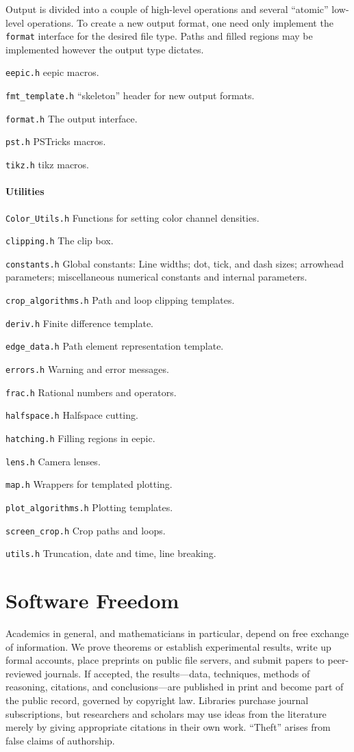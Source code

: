 \documentclass[12pt,letterpaper]{book}
\newcommand{\code}[1]{\texttt{#1}}
\newcommand{\Header}[1]{\smallskip\noindent\texttt{#1}\quad}%
\newcommand{\texinfoappendix}[2]{\chapter{#2}}
\begin{document}
Output is divided into a couple of high-level operations and several
``atomic'' low-level operations.  To create a new output
format, one need only implement the \code{format} interface for the
desired file type. Paths and filled regions may be implemented however
the output type dictates.

\Header{eepic.h} eepic macros.

\Header{fmt\_template.h} ``skeleton'' header for new output formats.

\Header{format.h} The output interface.

\Header{pst.h} PSTricks macros.

\Header{tikz.h} tikz macros.


\subsubsection*{Utilities}

\Header{Color\_Utils.h} Functions for setting color channel densities.

\Header{clipping.h} The clip box.

\Header{constants.h} Global constants: Line widths; dot, tick, and
dash sizes; arrowhead parameters; miscellaneous numerical constants
and internal parameters.

\Header{crop\_algorithms.h} Path and loop clipping templates.

\Header{deriv.h} Finite difference template.

\Header{edge\_data.h} Path element representation template.

\Header{errors.h} Warning and error messages.

\Header{frac.h} Rational numbers and operators.

\Header{halfspace.h} Halfspace cutting.

\Header{hatching.h} Filling regions in eepic.

\Header{lens.h} Camera lenses.

\Header{map.h} Wrappers for templated plotting.

\Header{plot\_algorithms.h} Plotting templates.

\Header{screen\_crop.h} Crop paths and loops.

\Header{utils.h} Truncation, date and time, line breaking.


\appendix
\texinfoappendix{A}{Software Freedom}

Academics in general, and mathematicians in particular, depend on free
exchange of information. We prove theorems or establish experimental
results, write up formal accounts, place preprints on public file
servers, and submit papers to peer-reviewed journals. If accepted, the
results---data, techniques, methods of reasoning, citations, and
conclusions---are published in print and become part of the public
record, governed by copyright law. Libraries purchase journal
subscriptions, but researchers and scholars may use ideas from the
literature merely by giving appropriate citations in their own
work. ``Theft'' arises from false claims of authorship.
\end{document}

